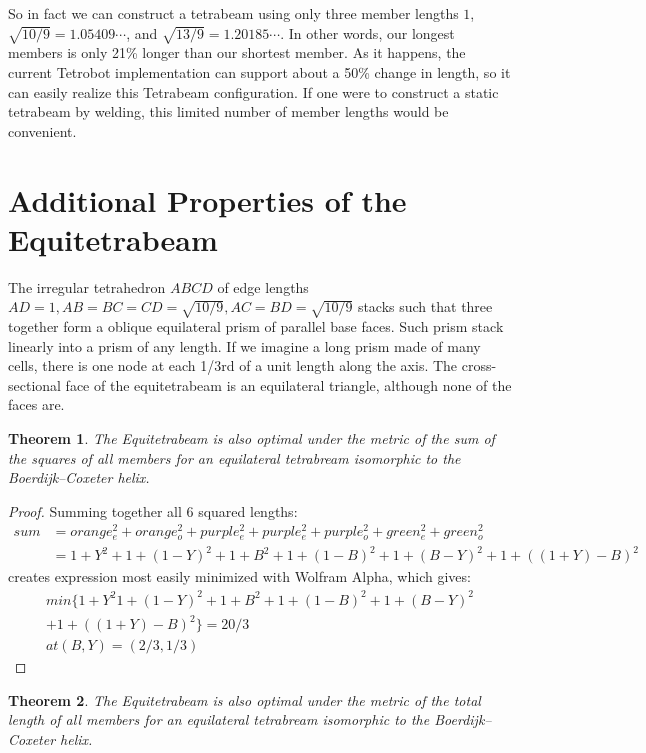 \documentclass[11pt]{article}
\newtheorem{theorem}{Theorem}
\begin{document}
So in fact we can construct a tetrabeam using only three member lengths $1$,
$\sqrt{10/9} = 1.05409\cdots$, and $\sqrt{13/9} = 1.20185\cdots$.
In other words, our longest members is only 21\% longer than our shortest member.
As it happens, the current Tetrobot implementation can support about a 50\%
change in length, so it can easily realize this Tetrabeam configuration. If one were
to construct a static tetrabeam by welding, this limited number of member lengths would be convenient.

\section{Additional Properties of the Equitetrabeam}

The irregular tetrahedron $ABCD$ of edge lengths $AD = 1, AB = BC = CD = \sqrt{10/9}, AC = BD = \sqrt{10/9}$ stacks
such that three together form a oblique equilateral prism of parallel base faces. Such prism stack linearly into
a prism of any length. If we imagine a long prism made of many cells, there is one node at each 1/3rd of a unit length
along the axis. The cross-sectional face of the equitetrabeam is an equilateral triangle, although none of the faces
are.

\begin{theorem}
  The Equitetrabeam is also optimal under the metric of the sum of the squares of all members
  for an equilateral tetrabream isomorphic to the Boerdijk--Coxeter helix.
  \end{theorem}

\begin{proof}
  Summing together all 6 squared lengths:
\begin{align*}
  sum &= orange_e^2 + orange_o^2 + purple_e^2 + purple_e^2 + purple_o^2 + green_e^2 + green_o^2 \\
   &= 1 + Y^2 + 1 + (1-Y)^2 +  1 + B^2 +  1+ (1-B)^2 + 1 + (B - Y)^2 + 1 + ((1+Y) - B)^2 
\end{align*}
  creates expression most easily minimized with Wolfram Alpha, which gives:
\begin{align*}
min\{1 + Y^2 1 + (1 - Y)^2 + 1 + B^2 + 1 + (1 - B)^2 + 1 + (B - Y)^2 \\
  + 1 + ((1 + Y) - B)^2\} = 20/3 \\
at (B, Y) = (2/3, 1/3)
\end{align*}
  
\end{proof}

\begin{theorem}
  The Equitetrabeam is also optimal under the metric of the total length of all members 
  for an equilateral tetrabream isomorphic to the Boerdijk--Coxeter helix.
\end{theorem}
\end{document}
